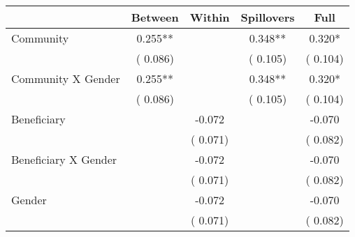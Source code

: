 
\begin{tabular}{l*{4}{c}}\hline&\multicolumn{1}{c}{Between}&\multicolumn{1}{c}{Within}&\multicolumn{1}{c}{Spillovers}&\multicolumn{1}{c}{Full}\\ \hline
 Community                                     &              0.255**      &                                               &        0.348** &         0.320*                            \\ 
                                                       &        (       0.086)           &                                       &       (       0.105)     &      (       0.104)                                           \\ 
 Community X Gender            &              0.255**      &                                               &        0.348** &         0.320*                            \\ 
                                                       &        (       0.086)           &                                       &       (       0.105)     &      (       0.104)                                           \\ 
 Beneficiary                           &                                               &       -0.072    &                                &            -0.070                            \\ 
                                                       &                                               & (       0.071)                  &                                        &      (       0.082)                                           \\ 
 Beneficiary X Gender          &                                               &       -0.072    &                                &            -0.070                            \\ 
                                                       &                                               & (       0.071)                  &                                        &      (       0.082)                                           \\ 
 Gender                                        &                              &       -0.072    &                                &            -0.070                            \\ 
                                                       &                                               & (       0.071)                  &                                        &      (       0.082)                                           \\ 

\end{tabular}
